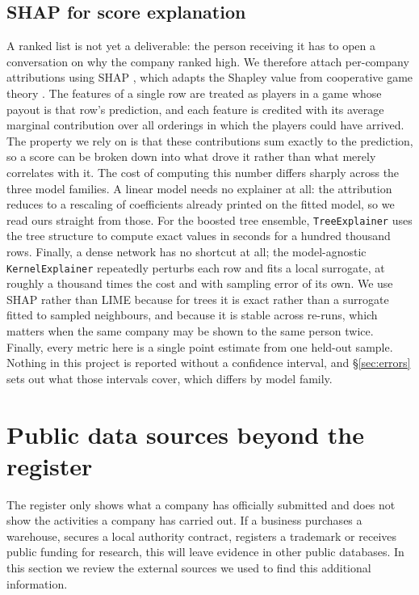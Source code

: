 \documentclass[    author={Samuel Menon Demelo; Sneha Saphala Ram Prasad; 
Viktor Ander Lindholm; Vishal Khatri},
               supervisor={Prof. Fernando Moreno-Pino},
                   degree={MSc},
                    title={Lloyds Commercial Banking Intelligence},
                 subtitle={Ranking SME Lending, Risk and Growth Prospects for Lloyds Banking Group},
                     type={},
                     year={2026}]{dissertation}
\begin{document}
\subsection{SHAP for score explanation}
\label{subsec:shap-background}
A ranked list is not yet a deliverable: the person receiving it has to open a conversation on why the company ranked high. We therefore attach per-company attributions using SHAP \cite{lundberg_lee_2017}, which adapts the Shapley value from cooperative game theory \cite{shapley1953value}. The features of a single row are treated as players in a game whose payout is that row's prediction, and each feature is credited with its average marginal contribution over all orderings in which the players could have arrived. The property we rely on is that these contributions sum exactly to the prediction, so a score can be broken down into what drove it rather than what merely correlates with it. The cost of computing this number differs sharply across the three model families. A linear model needs no explainer at all: the attribution reduces to a rescaling of coefficients already printed on the fitted model, so we read ours straight from those. For the boosted tree ensemble, \texttt{TreeExplainer} \cite{lundberg_etal_2020} uses the tree structure to compute exact values in seconds for a hundred thousand rows. Finally, a dense network has no shortcut at all; the model-agnostic \texttt{KernelExplainer} repeatedly perturbs each row and fits a local surrogate, at roughly a thousand times the cost and with sampling error of its own. We use SHAP rather than LIME \cite{ribeiro2016whyitrustyou} because for trees it is exact rather than a surrogate fitted to sampled neighbours, and because it is stable across re-runs, which matters when the same company may be shown to the same person twice. Finally, every metric here is a single point estimate from one held-out sample. Nothing in this project is reported without a confidence interval, and \S\ref{sec:errors} sets out what those intervals cover, which differs by model family.

\section{Public data sources beyond the register}
\label{sec:unstructued-data-sources}
The register only shows what a company has officially submitted and does not show the activities a company has carried out. If a business purchases a warehouse, secures a local authority contract, registers a trademark or receives public funding for research, this will leave evidence in other public databases. In this section we review the external sources we used to find this additional information.
\end{document}
